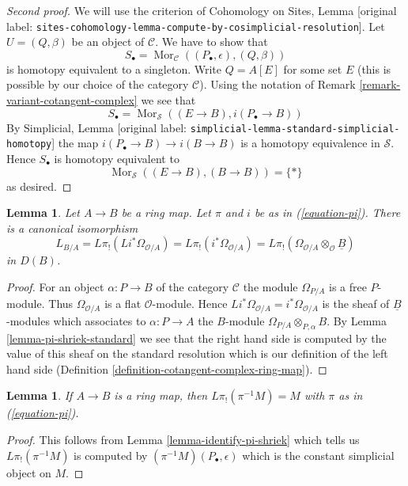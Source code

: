 \documentclass[10pt,a4paper]{article}
\theoremstyle{plain}
\newtheorem{lemma}[subsection]{Lemma}
\theoremstyle{definition}
\theoremstyle{remark}
\numberwithin{equation}{subsection}
\def\Mor{\mathop{\mathrm{Mor}}\nolimits}
\begin{document}
\begin{proof}[Second proof]
We will use the criterion of Cohomology on Sites, Lemma
\textnormal{[original label: \nolinkurl{sites-cohomology-lemma-compute-by-cosimplicial-resolution}]}.
Let $U = (Q, \beta)$ be an object of $\mathcal{C}$.
We have to show that
$$
S_\bullet = \Mor_\mathcal{C}((P_\bullet, \epsilon), (Q, \beta))
$$
is homotopy equivalent to a singleton. Write $Q = A[E]$ for some set $E$
(this is possible by our choice of the category $\mathcal{C}$). Using the
notation of Remark \ref{remark-variant-cotangent-complex} we see that
$$
S_\bullet = \Mor_\mathcal{S}((E \to B), i(P_\bullet \to B))
$$
By Simplicial, Lemma \textnormal{[original label: \nolinkurl{simplicial-lemma-standard-simplicial-homotopy}]}
the map $i(P_\bullet \to B) \to i(B \to B)$ is a homotopy equivalence
in $\mathcal{S}$. Hence $S_\bullet$ is homotopy equivalent to
$$
\Mor_\mathcal{S}((E \to B), (B \to B)) = \{*\}
$$
as desired.
\end{proof}

\begin{lemma}
\label{lemma-compute-cotangent-complex}
Let $A \to B$ be a ring map.  Let $\pi$ and $i$ be as in (\ref{equation-pi}).
There is a canonical isomorphism
$$
L_{B/A} = L\pi_!(Li^*\Omega_{\mathcal{O}/A}) =
L\pi_!(i^*\Omega_{\mathcal{O}/A}) =
L\pi_!(\Omega_{\mathcal{O}/A} \otimes_\mathcal{O} \underline{B})
$$
in $D(B)$.
\end{lemma}

\begin{proof}
For an object $\alpha : P \to B$ of the category $\mathcal{C}$
the module $\Omega_{P/A}$ is a free $P$-module. Thus
$\Omega_{\mathcal{O}/A}$ is a flat $\mathcal{O}$-module. Hence
$Li^*\Omega_{\mathcal{O}/A} = i^*\Omega_{\mathcal{O}/A}$ is the sheaf
of $\underline{B}$-modules which associates to $\alpha : P \to A$ the
$B$-module $\Omega_{P/A} \otimes_{P, \alpha} B$.
By Lemma \ref{lemma-pi-shriek-standard}
we see that the right hand side is computed by
the value of this sheaf on the standard resolution which is our
definition of the left hand side
(Definition \ref{definition-cotangent-complex-ring-map}).
\end{proof}

\begin{lemma}
\label{lemma-pi-lower-shriek-constant-sheaf}
If $A \to B$ is a ring map, then $L\pi_!(\pi^{-1}M) = M$
with $\pi$ as in (\ref{equation-pi}).
\end{lemma}

\begin{proof}
This follows from Lemma \ref{lemma-identify-pi-shriek} which tells us
$L\pi_!(\pi^{-1}M)$ is computed by $(\pi^{-1}M)(P_\bullet, \epsilon)$
which is the constant simplicial object on $M$.
\end{proof}
\end{document}
